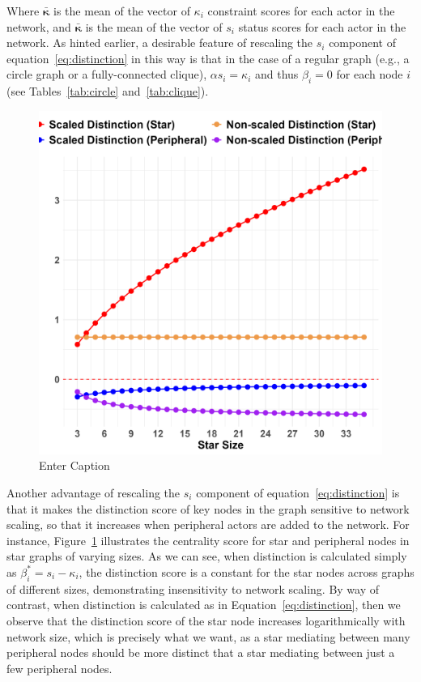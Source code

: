 \documentclass[12pt]{article}
\begin{document}
Where $\bar{\mathbf{\kappa}}$ is the mean of the vector of $\kappa_i$ constraint scores for each actor in the network, and $\bar{\mathbf{\kappa}}$ is the mean of the vector of $s_i$ status scores for each actor in the network. As hinted earlier, a desirable feature of rescaling the $s_i$ component of equation~\ref{eq:distinction} in this way is that in the case of a regular graph (e.g., a circle graph or a fully-connected clique), $\alpha s_i = \kappa_i$ and thus $\beta_i = 0$ for each node $i$ (see Tables~\ref{tab:circle} and~\ref{tab:clique}).  

\begin{figure}[ht!]
    \centering
    \includegraphics[width=0.6\linewidth]{Plots/star-roles-by-size.png}
    \caption{Enter Caption}
    \label{fig:star-scaling}
\end{figure}

Another advantage of rescaling the $s_i$ component of equation~\ref{eq:distinction} is that it makes the distinction score of key nodes in the graph sensitive to network scaling, so that it increases when peripheral actors are added to the network. For instance, Figure~\ref{fig:star-scaling} illustrates the centrality score for star and peripheral nodes in star graphs of varying sizes. As we can see, when distinction is calculated simply as $\beta^*_i = s_i - \kappa_i$, the distinction score is a constant for the star nodes across graphs of different sizes, demonstrating insensitivity to network scaling. By way of contrast, when distinction is calculated as in Equation~\ref{eq:distinction}, then we observe that the distinction score of the star node increases logarithmically with network size, which is precisely what we want, as a star mediating between many peripheral nodes should be more distinct that a star mediating between just a few peripheral nodes.  
\end{document}
